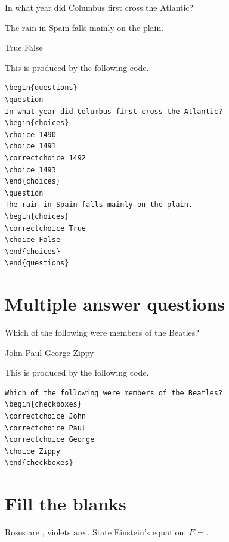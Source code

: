\documentclass{article}
\begin{document}
\begin{questions}
\question
In what year did Columbus first cross the Atlantic?
\begin{choices}
\end{choices}
\question
The rain in Spain falls mainly on the plain.
\begin{choices}
\correctchoice True 		
\choice False		
\end{choices}
\end{questions}

This is produced by the following code.
\begin{Verbatim}[frame=single]
\begin{questions}
\question
In what year did Columbus first cross the Atlantic?
\begin{choices}
\choice 1490 
\choice 1491 
\correctchoice 1492 
\choice 1493 
\end{choices}
\question
The rain in Spain falls mainly on the plain.
\begin{choices}
\correctchoice True 		
\choice False		
\end{choices}
\end{questions}
\end{Verbatim}

\section{Multiple answer questions}

Which of the following were members of the Beatles?
\begin{checkboxes}
\correctchoice John
\correctchoice Paul
\correctchoice George
\choice Zippy
\end{checkboxes}

This is produced by the following code.
\begin{Verbatim}[frame=single]
Which of the following were members of the Beatles?
\begin{checkboxes}
\correctchoice John
\correctchoice Paul
\correctchoice George
\choice Zippy
\end{checkboxes}
\end{Verbatim}

\section{Fill the blanks}

\begin{questions}
\question Roses are , violets are .
\question State Einstein's equation: $E=$.
\end{questions}
\end{document}
